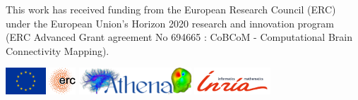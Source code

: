 \documentclass[a4paper]{article} %
\begin{document}
\vfill
\noindent This work has received funding from the European Research Council (ERC) under the European Union's Horizon 2020 research and innovation program (ERC Advanced Grant agreement No 694665 : CoBCoM - Computational Brain Connectivity Mapping).
\begin{center}
\includegraphics[height=1cm,keepaspectratio]{flag_yellow_high}
\qquad
\includegraphics[height=1cm,keepaspectratio]{erc_logo}
\qquad
\includegraphics[height=1cm,keepaspectratio]{athena-logo}
\qquad
\includegraphics[height=1cm,keepaspectratio]{logo_inria}
\end{center}




\end{document}
